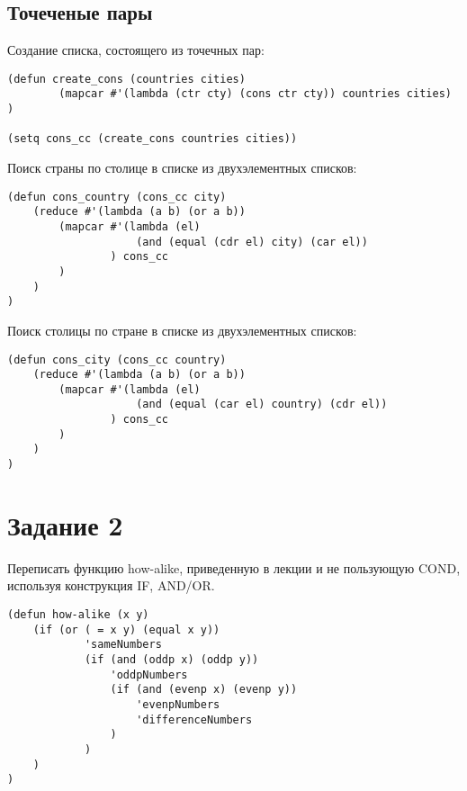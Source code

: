 \subsection{Точеченые пары}

Создание списка, состоящего из точечных пар:
\begin{lstlisting}
(defun create_cons (countries cities)
        (mapcar #'(lambda (ctr cty) (cons ctr cty)) countries cities)
)

(setq cons_cc (create_cons countries cities))
\end{lstlisting}

Поиск страны по столице в списке из двухэлементных списков:
\begin{lstlisting}
(defun cons_country (cons_cc city)
    (reduce #'(lambda (a b) (or a b))
        (mapcar #'(lambda (el)
                    (and (equal (cdr el) city) (car el))
                ) cons_cc
        )
    )
)
\end{lstlisting}

Поиск столицы по стране в списке из двухэлементных списков:
\begin{lstlisting}
(defun cons_city (cons_cc country)
    (reduce #'(lambda (a b) (or a b))
        (mapcar #'(lambda (el)
                    (and (equal (car el) country) (cdr el))
                ) cons_cc
        )
    )
)
\end{lstlisting}

\section{Задание \No{}2}

Переписать функцию how-alike, приведенную в лекции и не пользующую COND, используя конструкция IF, AND/OR.

\begin{lstlisting}
(defun how-alike (x y)
    (if (or ( = x y) (equal x y))
            'sameNumbers
            (if (and (oddp x) (oddp y))
                'oddpNumbers
                (if (and (evenp x) (evenp y))
                    'evenpNumbers
                    'differenceNumbers
                )
            )
    )
)
\end{lstlisting}
